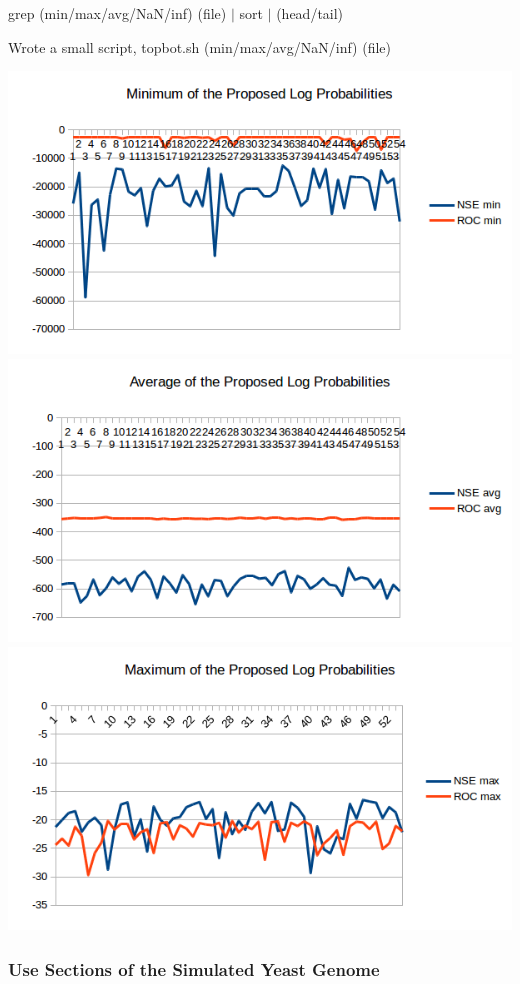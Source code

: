 grep (min/max/avg/NaN/inf) (file) $\vert$ sort $\vert$ (head/tail)

Wrote a small script, topbot.sh (min/max/avg/NaN/inf) (file)

\includegraphics{data/minROCvNSE.png}
\includegraphics{data/avgROCvNSE.png}
\includegraphics{data/maxROCvNSE.png}

\subsubsection{Use Sections of the Simulated Yeast Genome}

